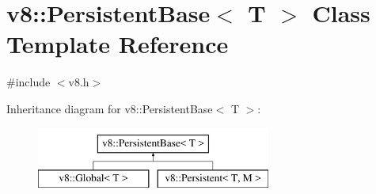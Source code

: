 \hypertarget{classv8_1_1PersistentBase}{}\section{v8\+:\+:Persistent\+Base$<$ T $>$ Class Template Reference}
\label{classv8_1_1PersistentBase}


{\ttfamily \#include $<$v8.\+h$>$}

Inheritance diagram for v8\+:\+:Persistent\+Base$<$ T $>$\+:\begin{figure}[H]
\begin{center}
\leavevmode
\includegraphics[height=2.000000cm]{classv8_1_1PersistentBase}
\end{center}
\end{figure}
